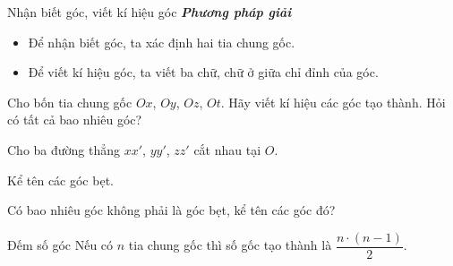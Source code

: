 \begin{dang}{Nhận biết góc, viết kí hiệu góc}
\textbf{\textit{Phương pháp giải}}\\
\begin{itemize}
\item Để nhận biết góc, ta xác định hai tia chung gốc.
\item Để viết kí hiệu góc, ta viết ba chữ, chữ ở giữa chỉ đỉnh của góc.
\end{itemize}
\end{dang}

\begin{vd}%
Cho bốn tia chung gốc $Ox$, $Oy$, $Oz$, $Ot$. Hãy viết kí hiệu các góc tạo thành. Hỏi có tất cả bao nhiêu góc?
\end{vd}

\begin{vd}%
Cho ba đường thẳng $xx'$, $yy'$, $zz'$ cắt nhau tại $O$.
\begin{enumEX}{1}
\item Kể tên các góc bẹt.
\item Có bao nhiêu góc không phải là góc bẹt, kể tên các góc đó?
\end{enumEX}
\end{vd}
\begin{dang}{Đếm số góc}
Nếu có $n$ tia chung gốc thì số gốc tạo thành là $\dfrac{n\cdot(n-1)}{2}$.
\end{dang}


